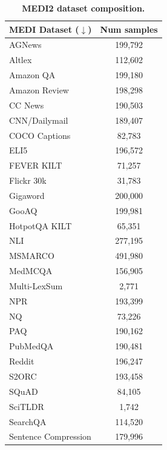 \documentclass{article}
\begin{document}
\begin{table}[!htb]
\begin{minipage}{.5\linewidth}
\centering
\caption{\textbf{MEDI2 dataset composition.}}
\begin{tabular}{l|c}
\toprule
MEDI Dataset ($\downarrow$) & Num samples \\
\midrule
AGNews \cite{zhang2016characterlevel} & 199,792 \\
Altlex \cite{hidey-mckeown-2016-identifying} & 112,602 \\
Amazon QA \cite{gupta2019amazonqa} & 199,180 \\
Amazon Review \cite{keung2020multilingual} & 198,298 \\
CC News \cite{Hamborg2017newspleaseA} & 190,503 \\
CNN/Dailymail \cite{fabbri2021summeval} & 189,407 \\
COCO Captions \cite{chen2015microsoft} & 82,783 \\
ELI5 \cite{fan2019eli5} & 196,572 \\
FEVER KILT \cite{thorne2018fever,petroni2021kilt} & 71,257 \\
Flickr 30k \cite{young2014image} & 31,783 \\
Gigaword \cite{rush2015neural,graff2003english} & 200,000 \\
GooAQ \cite{khashabi2021gooaq} & 199,981 \\
HotpotQA KILT \cite{yang2018hotpotqa,petroni2021kilt} & 65,351 \\
NLI \cite{gao2022simcse} & 277,195 \\
MSMARCO \cite{bajaj2018ms} & 491,980 \\
MedMCQA \cite{pal2022medmcqa} & 156,905 \\
Multi-LexSum \cite{shen2022multilexsum} & 2,771 \\
NPR \cite{NPR} & 193,399 \\
NQ \cite{kwiatkowski2019natural} & 73,226 \\
PAQ \cite{lewis2021paq} & 190,162 \\
PubMedQA \cite{jin2019pubmedqa} & 190,481 \\
Reddit \cite{Reddit} & 196,247 \\
S2ORC \cite{lo2020s2orc} & 193,458 \\
SQuAD \cite{rajpurkar2016squad} & 84,105 \\
SciTLDR \cite{cachola2020tldr} & 1,742 \\
SearchQA \cite{DBLP:journals/corr/DunnSHGCC17} & 114,520 \\
Sentence Compression \cite{Filippova2013OvercomingTL} & 179,996 \\

\end{tabular}
\end{minipage}
\end{table}
\end{document}
